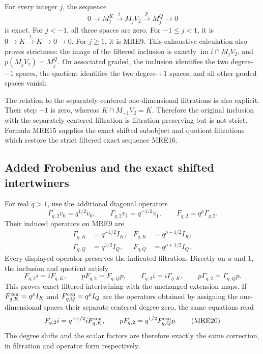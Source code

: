 For every integer \(j\), the sequence
\[
 0\longrightarrow M_j^K\xrightarrow{i}M_jV_2
     \xrightarrow{p}M_j^Q\longrightarrow0
 \tag{MRE16}
\]
is exact. For \(j<-1\), all three spaces are zero. For
\(-1\leq j<1\), it is \(0\to K\xrightarrow{1}K\to0\to0\).
For \(j\geq1\), it is MRE9. This exhaustive calculation also proves
strictness: the image of the filtered inclusion is exactly
\(\operatorname{im}i\cap M_jV_2\), and \(p(M_jV_2)=M_j^Q\).
On associated graded, the inclusion identifies the two degree-\(-1\)
spaces, the quotient identifies the two degree-\(+1\) spaces, and all
other graded spaces vanish.

The relation to the separately centered one-dimensional filtrations is
also explicit. Their step \(-1\) is zero, whereas
\(K\cap M_{-1}V_2=K\). Therefore the original inclusion with the separately
centered filtration is filtration preserving but is not strict. Formula
MRE15 supplies the exact shifted subobject and quotient filtrations
which restore the strict filtered exact sequence MRE16.

\subsection{Added Frobenius and the exact shifted intertwiners}

For real \(q>1\), use the additional diagonal operators
\[
 \Gamma_{q,2}v_0=q^{1/2}v_0,\qquad
 \Gamma_{q,2}v_1=q^{-1/2}v_1,\qquad
 F_{q,2}=q^\rho\Gamma_{q,2}.
 \tag{MRE17}
\]
Their induced operators on MRE9 are
\[
 \begin{aligned}
 \Gamma_{q,K}&=q^{-1/2}I_K,&
 F_{q,K}&=q^{\rho-1/2}I_K,\\
 \Gamma_{q,Q}&=q^{1/2}I_Q,&
 F_{q,Q}&=q^{\rho+1/2}I_Q.
 \end{aligned}
 \tag{MRE18}
\]
Every displayed operator preserves the indicated filtration. Directly on
\(u\) and \(\overline{1}\), the inclusion and quotient satisfy
\[
 F_{q,2}i=iF_{q,K},\qquad pF_{q,2}=F_{q,Q}p,
 \qquad
 \Gamma_{q,2}i=i\Gamma_{q,K},\qquad
 p\Gamma_{q,2}=\Gamma_{q,Q}p.
 \tag{MRE19}
\]
This proves exact filtered intertwining with the unchanged extension maps.
If \(F_{q,K}^{\rm cen}=q^\rho I_K\) and
\(F_{q,Q}^{\rm cen}=q^\rho I_Q\) are the operators obtained by assigning
the one-dimensional spaces their separate centered degree zero, the
same equations read
\[
 F_{q,2}i=q^{-1/2}iF_{q,K}^{\rm cen},\qquad
 pF_{q,2}=q^{1/2}F_{q,Q}^{\rm cen}p.
 \tag{MRE20}
\]
The degree shifts and the scalar factors are therefore exactly the same
correction, in filtration and operator form respectively.


